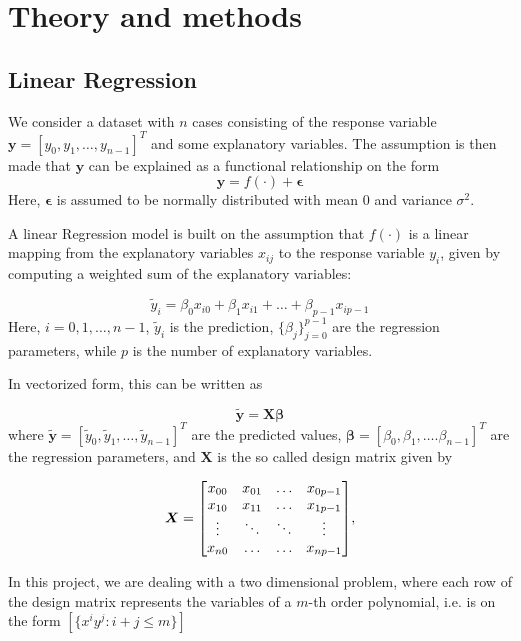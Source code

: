\section{Theory and methods}
\label{sec:theory}

\subsection{Linear Regression}
We consider a dataset with $n$ cases consisting of the response variable $\boldsymbol{y}=[y_0,y_1,\ldots,y_{n-1}]^T$ and some explanatory variables. The assumption is then made that $\boldsymbol{y}$ can be explained as a functional relationship on the form
\begin{equation}\label{eq_model}
	\boldsymbol{y} = {f}(\cdot) + \boldsymbol{\epsilon}
\end{equation}
Here, $\boldsymbol{\epsilon}$ is assumed to be normally distributed with mean 0 and variance $\sigma^2$.

A linear Regression model is built on the assumption that ${f}(\cdot)$ is a linear mapping from the explanatory variables $x_{ij}$ to the response variable $y_i$, given by computing a weighted sum of the explanatory variables:

\begin{equation*}
	\tilde{y}_i = \beta_0x_{i0} + \beta_1x_{i1} + \ldots + \beta_{p-1}x_{ip-1}
\end{equation*}
Here, $i=0,1,\ldots ,n-1$, $\tilde{y}_i$ is the prediction, $\{\beta_j\}_{j=0}^{p-1}$ are the regression parameters, while $p$ is the number of explanatory variables.

In vectorized form, this can be written as

\begin{equation*}
	\boldsymbol{\tilde{y}} = \boldsymbol{X}\boldsymbol{\beta}
\end{equation*}
where $\boldsymbol{\tilde{y}}=[\tilde{y}_0,\tilde{y}_1,\ldots, \tilde{y}_{n-1}]^T$ are the predicted values, $\boldsymbol{\beta}=[\beta_0, \beta_1, \ldots . \beta_{n-1}]^T$ are the regression parameters,  and $\boldsymbol{X}$ is the so called design matrix given by

\[\boldsymbol{X} =
\mqty[x_{00} & x_{01} & \hdots & x_{0p-1} \\
x_{10} & x_{11} & \hdots & x_{1p-1} \\
\vdots & \ddots & \ddots &  \vdots \\
x_{n0} & \hdots & \hdots & x_{np-1}],
\]

In this project, we are dealing with a two dimensional problem, where each row of the design matrix represents the variables of a $m$-th order polynomial, i.e. is on the form $[\{x^iy^j : i+j\leq m\}]$

